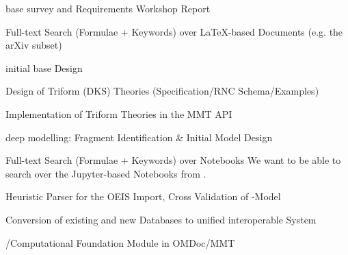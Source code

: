 \begin{workpackage}[id=dksbases,%
  title=Data/Knowledge/Software-Bases,lead=JU,
  ZHRM=12,JURM=46,UWRM=25,SARM=10,LLRM=2,PSRM=4]
\begin{wpdelivs}
  \begin{wpdeliv}[due=9,id=wsrep,dissem=PU,nature=R,lead=JU]{\DKS base survey and
      Requirements Workshop Report}
  \end{wpdeliv}
    \begin{wpdeliv}[id=mws,due=9,nature=OTHER,dissem=PU,lead=JU]
      {Full-text Search (Formulae + Keywords) over LaTeX-based Documents
        (e.g. the arXiv subset)}
    \end{wpdeliv}
  \begin{wpdeliv}[due=12,id=design,dissem=PU,nature=R,lead=JU]
        {initial \DKS base Design}
   \end{wpdeliv}
  \begin{wpdeliv}[due=15,id=dkstheories,dissem=PU,nature=R,lead=JU]
        {Design of Triform (DKS) Theories (Specification/RNC Schema/Examples)}
  \end{wpdeliv}
  \begin{wpdeliv}[due=15,id=dksimp,dissem=PU,nature=OTHER,lead=JU]
        {Implementation of Triform Theories in the MMT API}
  \end{wpdeliv}
  \begin{wpdeliv}[due=18,id=lmfmod,dissem=PU,nature=R,lead=ZH]
      {\LMFDB deep modelling: Fragment Identification \& Initial Model Design}
  \end{wpdeliv}
    \begin{wpdeliv}[id=notebooksearch,due=18,nature=OTHER,dissem=PU,lead=JU]
      {Full-text Search (Formulae + Keywords) over Notebooks}
      We want to be able to search over the Jupyter-based Notebooks from
      .
\end{wpdeliv}
  \begin{wpdeliv}[due=20,id=oeisparser,dissem=PU,nature=OTHER,lead=JU]
      {Heuristic Parser for the OEIS Import, Cross Validation of \DKS-Model}
  \end{wpdeliv}
  \begin{wpdeliv}[due=24,id=conv,dissem=PU,nature=DEC,lead=ZH]
        {Conversion of existing and new Databases to unified interoperable System}
   \end{wpdeliv}
  \begin{wpdeliv}[due=24,id=psfoundation,dissem=PU,nature=OTHER,lead=JU]
        {\Python/\Sage Computational Foundation Module in OMDoc/MMT}
  \end{wpdeliv}
  \begin{wpdeliv}[due=30,id=findstat,dissem=PU,nature=OTHER,lead=JU]

\end{wpdeliv}
\end{wpdelivs}
\end{workpackage}
